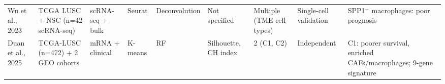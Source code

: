 \begin{longtable}{
p{1.0cm}
p{1.5cm}
p{1.3cm}
p{1.1cm}
p{1.2cm}
p{1.0cm}
p{1.4cm}
p{1.3cm}
p{2.8cm}
}
Wu et al., 2023 \parencite{Wu2023scRNA}
& TCGA LUSC + NSC (n=42 scRNA-seq)
& scRNA-seq + bulk
& Seurat
& Deconvolution
& Not specified
& Multiple (TME cell types)
& Single-cell validation
& SPP1$^+$ macrophages: poor prognosis \\[3pt]

Duan et al., 2025 \parencite{Duan2025}
& TCGA-LUSC (n=472) + 2 GEO cohorts
& mRNA + clinical
& K-means
& RF
& Silhouette, CH index
& 2 (C1, C2)
& Independent
& C1: poorer survival, enriched CAFs/macrophages; 9-gene signature \\

\end{longtable}

\normalsize
